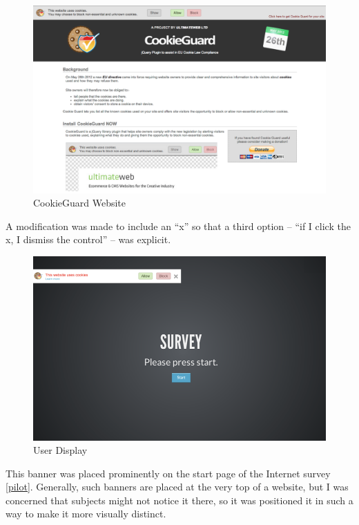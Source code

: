\begin{figure}
\centerline{
  \includegraphics[scale=.25]{chapter5.tex/cookieguard}
  }
\caption{CookieGuard Website}
\label{cookieguard}
\end{figure}


A modification was made to include an ``x'' so that a third option -- ``if I click the x, I dismiss the control'' -- was explicit.


\begin{figure}
\centerline{
  \includegraphics[scale=.3]{chapter5.tex/pilot}
  }
\caption{User Display}
\label{pilot}
\end{figure}


This banner was placed prominently on the start page of the Internet survey  \autoref{pilot}.  Generally, such banners are placed at the very top of a website, but I was concerned that subjects might not notice it there, so it was positioned it in such a way to make it more visually distinct.

